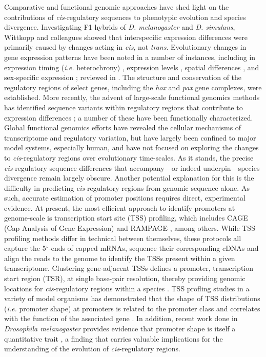 \documentclass[nogrid]{MBE}%
\begin{document}
Comparative and functional genomic approaches have shed light on the contributions of \textit{cis}-regulatory sequences to phenotypic evolution and species divergence. Investigating F1 hybrids of \textit{D. melanogaster} and \textit{D. simulans}, Wittkopp and colleagues \citep{Wittkopp.2004} showed that interspecific expression differences were primarily caused by changes acting in \textit{cis}, not \textit{trans}. Evolutionary changes in gene expression patterns have been noted in a number of instances, including in expression timing (\textit{i.e.} heterochrony) \citep{Wray.1989}, expression levels \citep{Crawford.1999}, spatial differences \citep{Abzhanov.2000}, and sex-specific expression \citep{Kopp.2000}; reviewed in \citep{Wray.2003}. The structure and conservation of the regulatory regions of select genes, including the \textit{hox} \citep{Kmita.2002} and \textit{pax} \citep{Plaza.1999} gene complexes, were established. More recently, the advent of large-scale functional genomics methods has identified sequence variants within regulatory regions that contribute to expression differences \citep{Lappalainen.2013, Pickrell.2010, Schor.2017}; a number of these have been functionally characterized. Global functional genomics efforts have revealed the cellular mechanisms of transcriptome and regulatory variation, but have largely been confined to major model systems, especially human, and have not focused on exploring the changes to \textit{cis}-regulatory regions over evolutionary time-scales. As it stands, the precise \textit{cis}-regulatory sequence differences that accompany---or indeed underpin---species divergence remain largely obscure. Another potential explanation for this is the difficulty in predicting \textit{cis}-regulatory regions from genomic sequence alone. As such, accurate estimation of promoter positions requires direct, experimental evidence. At present, the most efficient approach to identify promoters at genome-scale is transcription start site (TSS) profiling, which includes CAGE (Cap Analysis of Gene Expression) \citep{Murata.2014} and RAMPAGE \citep{Batut.2013}, among others. While TSS profiling methods differ in technical between themselves, these protocols all capture the 5$`$-ends of capped mRNAs, sequence their corresponding cDNAs and align the reads to the genome to identify the TSSs present within a given transcriptome. Clustering gene-adjacent TSSs defines a promoter, transcription start region (TSR), at single base-pair resolution, thereby providing genomic locations for \textit{cis}-regulatory regions within a species \citep{Lenhard.2012, Rach.2009}. TSS profling studies in a variety of model organisms has demonstrated that the shape of TSS distributions (\textit{i.e.} promoter shape) at promoters is related to the promoter class and correlates with the function of the associated gene \citep{Carninci.2006, Rach.2009, Hoskins.2011, Raborn.2016}. In addition, recent work done in \textit{Drosophila melanogaster} provides evidence that promoter shape is itself a quantitative trait \citep{Schor.2017}, a finding that carries valuable implications for the understanding of the evolution of \textit{cis}-regulatory regions. \\
\end{document}
